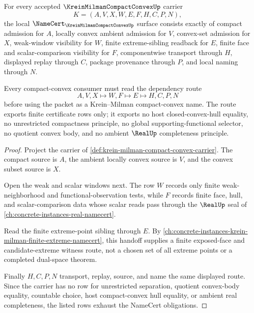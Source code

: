 \begin{theorem}
\label{thm:krein-milman-compact-convex-namecert-obligations}
For every accepted $\KreinMilmanCompactConvexUp$ carrier
$$
K=(A,V,X,W,E,F,H,C,P,N),
$$
the local $\NameCert_{\KreinMilmanCompactConvexUp}$ surface consists exactly of compact admission for $A$, locally convex ambient admission for $V$, convex-set admission for $X$, weak-window visibility for $W$, finite extreme-sibling readback for $E$, finite face and scalar-comparison visibility for $F$, componentwise transport through $H$, displayed replay through $C$, package provenance through $P$, and local naming through $N$.

Every compact-convex consumer must read the dependency route
$$
A,V,X \longmapsto W,F \longmapsto E \longmapsto H,C,P,N
$$
before using the packet as a Krein--Milman compact-convex name. The route exports finite certificate rows only; it exports no host closed-convex-hull equality, no unrestricted compactness principle, no global supporting-functional selector, no quotient convex body, and no ambient $\RealUp$ completeness principle.
\end{theorem}
\begin{proof}
Project the carrier of \autoref{def:krein-milman-compact-convex-carrier}. The compact source is $A$, the ambient locally convex source is $V$, and the convex subset source is $X$.

Open the weak and scalar windows next. The row $W$ records only finite weak-neighborhood and functional-observation tests, while $F$ records finite face, hull, and scalar-comparison data whose scalar reads pass through the $\RealUp$ seal of \autoref{ch:concrete-instances-real-namecert}.

Read the finite extreme-point sibling through $E$. By \autoref{ch:concrete-instances-krein-milman-finite-extreme-namecert}, this handoff supplies a finite exposed-face and candidate-extreme witness route, not a chosen set of all extreme points or a completed dual-space theorem.

Finally $H,C,P,N$ transport, replay, source, and name the same displayed route. Since the carrier has no row for unrestricted separation, quotient convex-body equality, countable choice, host compact-convex hull equality, or ambient real completeness, the listed rows exhaust the NameCert obligations.
\end{proof}

